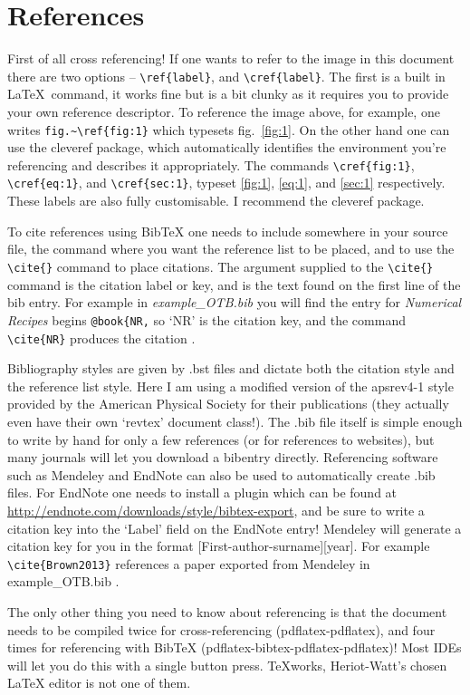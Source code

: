 \documentclass[a4paper,11pt,twoside]{article}		%
\begin{document}
\section{References}
\label{sec:4}
First of all cross referencing! If one wants to refer to the image in this document there are two options -- \verb:\ref{label}:, and \verb:\cref{label}:. The first is a built in \LaTeX\ command, it works fine but is a bit clunky as it requires you to provide your own reference descriptor. To reference the image above, for example, one writes \verb;fig.~\ref{fig:1}; which typesets fig.~\ref{fig:1}. On the other hand one can use the cleveref package, which automatically identifies the environment you're referencing and describes it appropriately. The commands \verb;\cref{fig:1};, \verb;\cref{eq:1};, and \verb;\cref{sec:1};, typeset \cref{fig:1}, \cref{eq:1}, and \cref{sec:1} respectively. These labels are also fully customisable. I recommend the cleveref package.

To cite references using BibTeX one needs to include \verb:: somewhere in your source file, the command \verb:: where you want the reference list to be placed, and to use the \verb:\cite{}: command to place citations. The argument supplied to the \verb:\cite{}: command is the citation label or key, and is the text found on the first line of the bib entry. For example in \emph{example\_OTB.bib} you will find the entry for \emph{Numerical Recipes} begins \verb:@book{NR,: so `NR' is the citation key, and the command \verb:\cite{NR}: produces the citation \cite{NR}.

Bibliography styles are given by .bst files and dictate both the citation style and the reference list style. Here I am using a modified version of the apsrev4-1 style provided by the American Physical Society for their publications (they actually even have their own `revtex' document class!). The .bib file itself is simple enough to write by hand for only a few references (or for references to websites), but many journals will let you download a bibentry directly. Referencing software such as Mendeley and EndNote can also be used to automatically create .bib files. For EndNote one needs to install a plugin which can be found at \url{http://endnote.com/downloads/style/bibtex-export}, and be sure to write a citation key into the `Label' field on the EndNote entry! Mendeley will generate a citation key for you in the format [First-author-surname][year]. For example \verb:\cite{Brown2013}: references a paper exported from Mendeley in example\_OTB.bib \cite{Brown2013}.  

The only other thing you need to know about referencing is that the document needs to be compiled twice for cross-referencing (pdflatex-pdflatex), and four times for referencing with BibTeX (pdflatex-bibtex-pdflatex-pdflatex)! Most IDEs will let you do this with a single button press. TeXworks,  Heriot-Watt's chosen LaTeX editor is not one of them.



\end{document}
